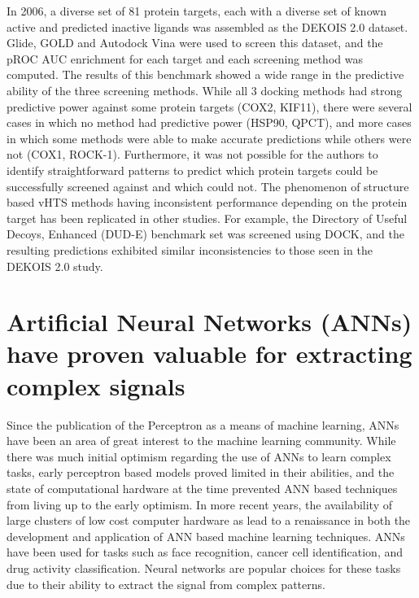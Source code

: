 In 2006, a diverse set of 81 protein targets, each with a diverse set of known active and predicted inactive ligands was assembled as the DEKOIS 2.0 dataset\citep{Bauer:2013de}.
Glide, GOLD and Autodock Vina were used to screen this dataset, and the pROC AUC enrichment for each target and each screening method was computed.
The results of this benchmark showed a wide range in the predictive ability of the three screening methods.  
While all 3 docking methods had strong predictive power against some protein targets (COX2, KIF11), there were several cases in which no method had predictive power (HSP90, QPCT), and more cases in which some methods were able to make accurate predictions while others were not (COX1, ROCK-1).
Furthermore, it was not possible for the authors to identify straightforward patterns to predict which protein targets could be successfully screened against and which could not. 
The phenomenon of structure based vHTS methods having inconsistent performance depending on the protein target has been replicated in other studies.
For example, the Directory of Useful Decoys, Enhanced (DUD-E) benchmark set was screened using DOCK, and the resulting predictions exhibited similar inconsistencies to those seen in the DEKOIS 2.0 study\citep{Mysinger:2012hu}.

\section{Artificial Neural Networks (ANNs) have proven valuable for extracting complex signals}

Since the publication of the Perceptron as a means of machine learning\citep{Rosenblatt:1958jc}, ANNs have been an area of great interest to the machine learning community.
While there was much initial optimism regarding the use of ANNs to learn complex tasks, early perceptron based models proved limited in their abilities\citep{Gallant:1990hk}, and the state of computational hardware at the time prevented ANN based techniques from living up to the early optimism.
In more recent years, the availability of large clusters of low cost computer hardware as lead to a renaissance in both the development and application of ANN based machine learning techniques.
ANNs have been used for tasks such as face recognition\citep{Zhao:2003bf}, cancer cell identification\citep{Zhou:2002ew}, and drug activity classification\citep{Gohlke:2002in}.
Neural networks are popular choices for these tasks due to their ability to extract the signal from complex patterns.

